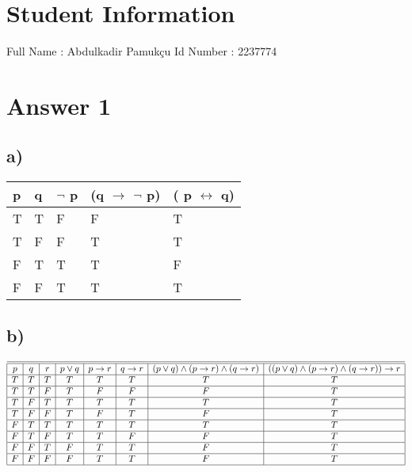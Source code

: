 \documentclass[12pt]{article}
\begin{document}
\section*{Student Information } 
Full Name :  Abdulkadir Pamukçu
Id Number :  2237774

\section*{Answer 1}
\subsection*{a)}

\begin{tabular}{ |p{1cm}|p{1cm}|p{1cm}|p{2cm}|p{2cm}| }
 \hline

 \hline
 p & q & $\neg$ p & (q $\rightarrow$ $\neg$ p) & ( p $\leftrightarrow$ q)\\
 \hline
 T   & T    &F&   F & T\\
 \hline
T&   F  & F   &T & T\\
 \hline
 F &T & T&  T & F\\
 \hline
 F    &F & T&  T & T\\

\hline
\end{tabular}

\subsection*{b)}

\begin{displaymath}
\begin{array}{|c|c|c|c|c|c|c|c|c}
 \hline

 \hline
p & q & r & p \lor q & p \to r & q \rightarrow r & (p \lor q) \land (p \to r) \land (q \to r) & ((p \lor q) \land (p \to r) \land (q \to r)) \to r\\
 \hline
 T   & T  & T &  T & T & T & T & T\\
 \hline
 T   & T  &F &  T & F & F & F & T\\
 \hline
 T   & F  & T &  T & T & T & T & T\\
 \hline
 T   & F  & F &  T & F & T & F & T\\
 \hline
  F   & T  & T &  T & T & T & T & T\\
 \hline
  F   & T  & F &  T & T & F &F & T\\
 \hline
 F   & F  & T &  F & T & T & F& T\\
 \hline
 F   & F  &F &  F & T & T & F & T\\
 \hline
\end{array}
\end{displaymath}
\\
\end{document}
